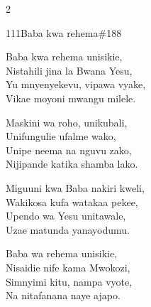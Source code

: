 \begin{multicols}{2}
\begin{hymn}{111}{Baba kwa rehema}{\#188}
\begin{stanza}
Baba kwa rehema unisikie,\\
Nistahili jina la Bwana Yesu,\\
Yu mnyenyekevu, vipawa vyake,\\
Vikae moyoni mwangu milele.
\end{stanza}
\begin{stanza}
Maskini wa roho, unikubali,\\
Unifungulie ufalme wako,\\
Unipe neema na nguvu zako,\\
Nijipande katika shamba lako.
\end{stanza}
\begin{stanza}
Miguuni kwa Baba nakiri kweli,\\
Wakikosa kufa watakaa pekee,\\
Upendo wa Yesu unitawale,\\
Uzae matunda yanayodumu.
\end{stanza}
\begin{stanza}
Baba wa rehema unisikie,\\
Nisaidie nife kama Mwokozi,\\
Simnyimi kitu, nampa vyote,\\
Na nitafanana naye ajapo.
\end{stanza}
\end{hymn}


\end{multicols}

